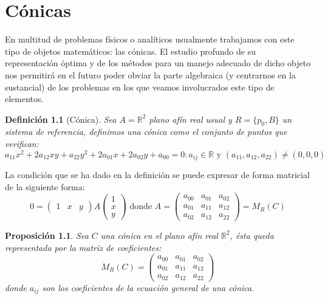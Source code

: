 \documentclass[10pt,a4paper,openright]{book}
\theoremstyle{break}
\newtheorem*{defi}{Definición}
\newtheorem*{prop}{Proposición}
\begin{document}
\chapter{Cónicas}
En multitud de problemas físicos o analíticos usualmente trabajamos con este tipo de objetos matemáticos: las cónicas. El estudio profundo de su representación óptima y de los métodos para un manejo adecuado de dicho objeto nos permitirá en el futuro poder obviar la parte algebraica (y centrarnos en la sustancial) de los problemas en los que veamos involucrados este tipo de elementos.

\begin{defi}[Cónica]
Sea $A = \mathbb{R}^2$ plano afín real usual y $R=\{p_0, B\}$ un sistema de referencia, definimos una cónica como el conjunto de puntos que verifican:
$$a_{11}x^2 + 2a_{12}xy + a_{22}y^2 + 2a_{01} x + 2a_{02} y + a_{00} = 0:  a_{ij} \in \mathbb{R} \mbox{ y } (a_{11}, a_{12}, a_{22}) \neq (0,0,0)$$
\end{defi}

La condición que se ha dado en la definición se puede expresar de forma matricial de la siguiente forma:
$$0 = \begin{pmatrix}
1 & x & y
\end{pmatrix} A \begin{pmatrix}
1 \\ x \\ y
\end{pmatrix}\mbox{ donde }A = \begin{pmatrix} a_{00} & a_{01} & a_{02} \\
a_{01} & a_{11} & a_{12} \\ a_{02} & a_{12} & a_{22}
\end{pmatrix} = M_R (C)$$

\begin{prop}
Sea $C$ una cónica en el plano afín real $\mathbb{R}^2$, ésta queda representada por la matriz de coeficientes:
$$M_R(C) = \begin{pmatrix} a_{00} & a_{01} & a_{02} \\
a_{01} & a_{11} & a_{12} \\ a_{02} & a_{12} & a_{22}
\end{pmatrix}$$
donde $a_{ij}$ son los coeficientes de la ecuación general de una cónica.
\end{prop}
\end{document}
